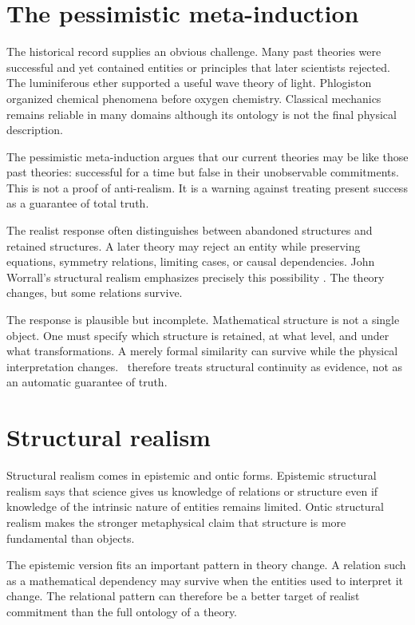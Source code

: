 \section{The pessimistic meta-induction}

The historical record supplies an obvious challenge. Many past theories were
successful and yet contained entities or principles that later scientists
rejected. The luminiferous ether supported a useful wave theory of light.
Phlogiston organized chemical phenomena before oxygen chemistry. Classical
mechanics remains reliable in many domains although its ontology is not the
final physical description.

The pessimistic meta-induction argues that our current theories may be like
those past theories: successful for a time but false in their unobservable
commitments. This is not a proof of anti-realism. It is a warning against
treating present success as a guarantee of total truth.

The realist response often distinguishes between abandoned structures and
retained structures. A later theory may reject an entity while preserving
equations, symmetry relations, limiting cases, or causal dependencies. John
Worrall's structural realism emphasizes precisely this possibility
\citep{worrall1989}. The theory changes, but some relations survive.

The response is plausible but incomplete. Mathematical structure is not a
single object. One must specify which structure is retained, at what level, and
under what transformations. A merely formal similarity can survive while the
physical interpretation changes. \RCR\ therefore treats structural continuity
as evidence, not as an automatic guarantee of truth.

\section{Structural realism}

Structural realism comes in epistemic and ontic forms. Epistemic structural
realism says that science gives us knowledge of relations or structure even if
knowledge of the intrinsic nature of entities remains limited. Ontic structural
realism makes the stronger metaphysical claim that structure is more
fundamental than objects.

The epistemic version fits an important pattern in theory change. A relation
such as a mathematical dependency may survive when the entities used to
interpret it change. The relational pattern can therefore be a better target of
realist commitment than the full ontology of a theory.

